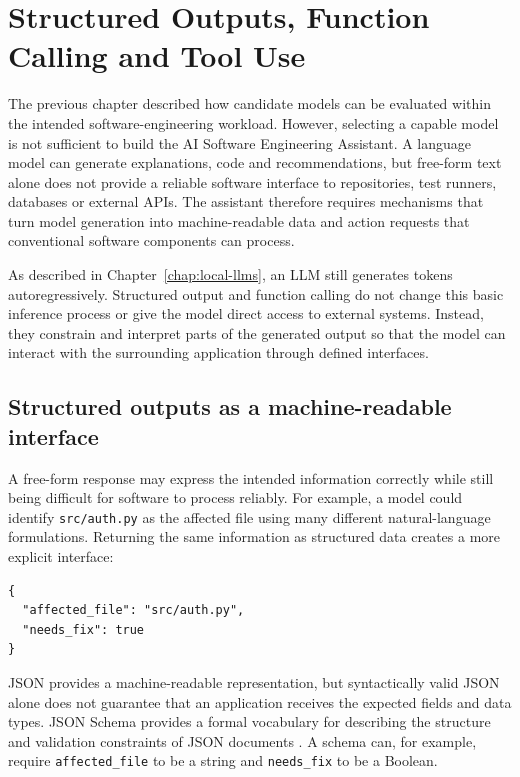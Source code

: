 \chapter{Structured Outputs, Function Calling and Tool Use}
\label{chap:tool-use}


The previous chapter described how candidate models can be evaluated within the intended software-engineering workload. However, selecting a capable model is not sufficient to build the AI Software Engineering Assistant. A language model can generate explanations, code and recommendations, but free-form text alone does not provide a reliable software interface to repositories, test runners, databases or external APIs. The assistant therefore requires mechanisms that turn model generation into machine-readable data and action requests that conventional software components can process.

As described in Chapter~\ref{chap:local-llms}, an LLM still generates tokens autoregressively. Structured output and function calling do not change this basic inference process or give the model direct access to external systems. Instead, they constrain and interpret parts of the generated output so that the model can interact with the surrounding application through defined interfaces.

\section{Structured outputs as a machine-readable interface}
\label{sec:structured-outputs}

A free-form response may express the intended information correctly while still being difficult for software to process reliably. For example, a model could identify \texttt{src/auth.py} as the affected file using many different natural-language formulations. Returning the same information as structured data creates a more explicit interface:

\noindent\begin{minipage}{\linewidth}
\small\singlespacing
\begin{verbatim}
{
  "affected_file": "src/auth.py",
  "needs_fix": true
}
\end{verbatim}
\end{minipage}

JSON provides a machine-readable representation, but syntactically valid JSON alone does not guarantee that an application receives the expected fields and data types. JSON Schema provides a formal vocabulary for describing the structure and validation constraints of JSON documents \parencite{jsonschema2022}. A schema can, for example, require \texttt{affected\_file} to be a string and \texttt{needs\_fix} to be a Boolean.

